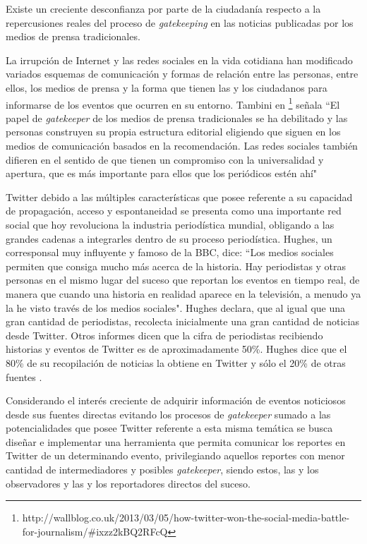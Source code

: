Existe un creciente desconfianza por parte de la ciudadanía respecto a la repercusiones reales del proceso de \emph{gatekeeping} en las noticias publicadas por los medios de prensa tradicionales.

La irrupción de Internet y las redes sociales en la vida cotidiana han modificado variados esquemas de comunicación y formas de relación
entre las personas, entre ellos, los medios de prensa y la forma que tienen las y los ciudadanos para informarse de los eventos que ocurren en su entorno. Tambini en  \footnote{http://wallblog.co.uk/2013/03/05/how-twitter-won-the-social-media-battle-for-journalism/\#ixzz2kBQ2RFcQ } señala ``El papel de \emph{gatekeeper} de los medios de prensa tradicionales se ha debilitado y las personas construyen su propia estructura editorial eligiendo que siguen en los medios de comunicación basados en la recomendación. Las redes sociales también difieren en el sentido de que tienen un compromiso con la universalidad y apertura, que es más importante para ellos que los periódicos estén ahí" 

Twitter debido a las múltiples características que posee referente a su capacidad de propagación, acceso y espontaneidad se presenta como una importante red social que hoy revoluciona la industria periodística mundial, obligando a las grandes cadenas a integrarles dentro de su proceso periodística. Hughes, un corresponsal muy influyente y famoso de la BBC, dice: ``Los medios sociales permiten que consiga mucho más acerca de la historia. Hay periodistas y otras personas en el mismo lugar del suceso que reportan los eventos en tiempo real, de manera que cuando una historia en realidad aparece en la televisión, a menudo ya la he visto través de los medios sociales". Hughes declara, que al igual que una gran cantidad de periodistas, recolecta inicialmente una gran cantidad de noticias desde Twitter. Otros informes dicen que la cifra de periodistas recibiendo historias y eventos de Twitter es de aproximadamente 50\%. Hughes dice que el 80\% de su recopilación de noticias la obtiene en Twitter y sólo el 20\% de otras fuentes \cite{RePEc:ehl:lserod:59881}.

Considerando el interés creciente de adquirir información de eventos noticiosos desde sus fuentes directas evitando los procesos de \emph{gatekeeper} sumado a las potencialidades que posee Twitter referente a esta misma temática se busca diseñar e implementar una herramienta que permita comunicar los reportes en Twitter de un determinando evento, privilegiando aquellos reportes con menor cantidad de intermediadores y posibles \emph{gatekeeper}, siendo estos, las y los observadores y las y los reportadores directos del suceso.

